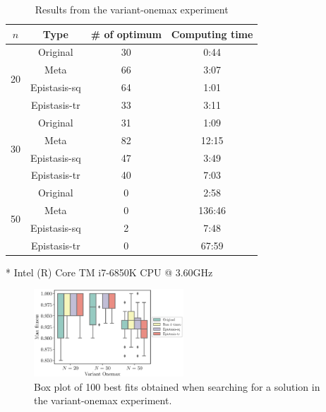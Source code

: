\begin{table}[ht!]
	\centering
	\begin{threeparttable}
	\caption{Results from the variant-onemax experiment} \label{tab:result_var}
	\begin{tabular}{cccc}
	\toprule
	$ n $ & Type & \# of optimum & Computing time\tnote{*} \\
	\midrule
	\multirow{4}{*}{20} & Original		& 30 & 0:44 \\
	& Meta			& 66 & 3:07 \\
	& Epistasis-sq	& 64 & 1:01 \\
	& Epistasis-tr	& 33 & 3:11 \\
	\midrule
	\multirow{4}{*}{30} & Original		& 31 & 1:09  \\
	& Meta			& 82 & 12:15 \\
	& Epistasis-sq	& 47 & 3:49  \\
	& Epistasis-tr	& 40 & 7:03  \\
	\midrule
	\multirow{4}{*}{50} & Original		& 0  & 2:58   \\
	& Meta			& 0  & 136:46 \\
	& Epistasis-sq	& 2	 & 7:48   \\
	& Epistasis-tr	& 0	 & 67:59  \\	
	\bottomrule
	\end{tabular}
		\begin{tablenotes}
			\footnotesize
			\item[*] Intel (R) Core TM i7-6850K CPU @ 3.60GHz
		\end{tablenotes}
	\end{threeparttable}
\end{table}


\begin{figure}[ht!]
	\centering
	\includegraphics[width=0.5\textwidth]{./boxplot_Onemax}
	\caption{Box plot of 100 best fits obtained when searching for a solution in the variant-onemax experiment.} \label{fig:boxplot_var}
\end{figure}

